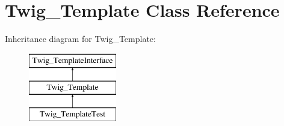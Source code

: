 \hypertarget{classTwig__Template}{}\section{Twig\+\_\+\+Template Class Reference}
\label{classTwig__Template}
Inheritance diagram for Twig\+\_\+\+Template\+:\begin{figure}[H]
\begin{center}
\leavevmode
\includegraphics[height=3.000000cm]{classTwig__Template}
\end{center}
\end{figure}
